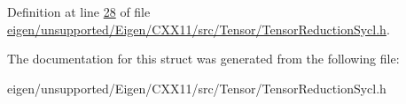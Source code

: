 Definition at line \hyperlink{eigen_2unsupported_2_eigen_2_c_x_x11_2src_2_tensor_2_tensor_reduction_sycl_8h_source_l00028}{28} of file \hyperlink{eigen_2unsupported_2_eigen_2_c_x_x11_2src_2_tensor_2_tensor_reduction_sycl_8h_source}{eigen/unsupported/\+Eigen/\+C\+X\+X11/src/\+Tensor/\+Tensor\+Reduction\+Sycl.\+h}.



The documentation for this struct was generated from the following file\+:\begin{DoxyCompactItemize}
\item 
eigen/unsupported/\+Eigen/\+C\+X\+X11/src/\+Tensor/\+Tensor\+Reduction\+Sycl.\+h\end{DoxyCompactItemize}

